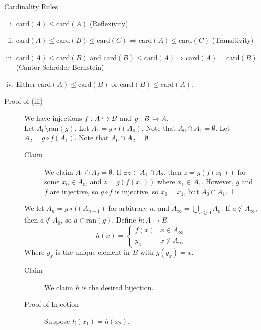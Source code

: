 \documentclass[10pt]{extarticle}
\begin{document}
    \begin{problem}{Cardinality Rules}
      \begin{enumerate}[(i)]
        \item $\text{card}(A) \leq \text{card}(A)$ (Reflexivity)
        \item $\text{card}(A)\leq \text{card}(B) \leq \text{card}(C)\Rightarrow \text{card}(A) \leq \text{card}(C)$ (Transitivity)
        \item $\text{card}(A) \leq \text{card}(B)$ and $\text{card}(B) \leq \text{card}(A) \Rightarrow \text{card}(A) = \text{card}(B)$ (Cantor-Schröder-Bernstein)
        \item Either $\text{card}(A) \leq \text{card}(B)$ or $\text{card}(B) \leq \text{card}(A)$.
      \end{enumerate}
      \tcblower
      \begin{description}
        \item[Proof of (iii)] We have injections $f: A\xhookrightarrow{}B$ and $g:B\xhookrightarrow{} A$.\\

          Let $A_0 \setminus \text{ran}(g)$. Let $A_1 = g\circ f(A_0)$. Note that $A_0 \cap A_1 = \emptyset$. Let $A_2 = g\circ f(A_1)$. Note that $A_0\cap A_2 =\emptyset$.
          \begin{description}
            \item[Claim] We claim $A_1 \cap A_2 = \emptyset$. If $\exists z\in A_1\cap A_2$, then $z = g(f(x_0))$ for some $x_0 \in A_0$, and $z = g(f(x_1))$ where $x_1\in A_1$. However, $g$ and $f$ are injective, so $g\circ f$ is injective, so $x_0 = x_1$, but $A_0\cap A_1$. $\bot$
          \end{description}
          We let $A_n = g\circ f(A_{n-1})$ for arbitrary $n$, and $A_{\infty} = \bigcup_{n\geq 0} A_n$. If $a\notin A_{\infty}$, then $a\notin A_0$, so $a\in \text{ran}(g)$. Define $h: A\rightarrow B$.
          \[
            h(x) = \begin{cases}
              f(x) & x\in A_{\infty}\\
              y_x & x\notin A_{\infty}
            \end{cases}
          \] 
          Where $y_x$ is the unique element in $B$ with $g(y_x) = x$.
          \begin{description}
            \item[Claim] We claim $h$ is the desired bijection.
            \item[Proof of Injection] Suppose $h(x_1) = h(x_2)$.\\


\end{description}
\end{description}
\end{problem}
\end{document}
